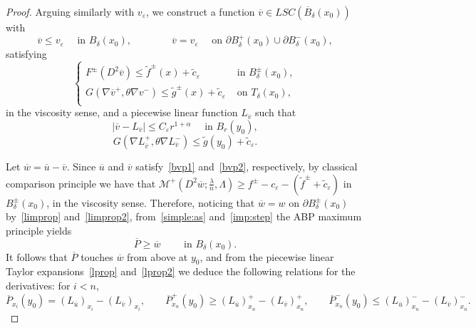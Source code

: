 \documentclass[letter,11pt]{amsart}
\newcommand{\vep}{\varepsilon}
\newcommand{\mcal}{\mathcal{M}}
\newcommand{\lowers}{LSC}
\theoremstyle{definition}
\numberwithin{equation}{section}
\begin{document}
\begin{proof}
Arguing similarly with $v_{\vep}$, we construct a function $\overline{v} \in \lowers(\overline{B}_{\delta}(x_0))$ with
\begin{equation}
\label{limprop2}
\overline{v} \leq v_{\vep} \quad \text{ in } B_{\delta}(x_0),
\qquad \qquad
\overline{v} = v_{\vep} \quad \text{ on } \partial B_{\delta}^{+}(x_0) \cup \partial B_{\delta}^{-}(x_0),
\end{equation}
satisfying
\begin{equation}
\label{bvp2}
\begin{cases}
F^{\pm}(D^2 \overline{v}) \leq \widetilde{f}^{\pm}(x) +\widetilde{c}_{\vep} & \text{ in } B_{\delta}^{\pm}(x_0),\\
G(\nabla \overline{v}^{+}, \theta \nabla v^{-}) \leq \widetilde{g}^{\pm}(x) +\widetilde{c}_{\vep} & \text{ on } T_{\delta}(x_0),\\
\end{cases}
\end{equation}
in the viscosity sense, and a piecewise linear function $L_{\overline{v}}$ such that
\begin{equation}
\label{lprop2}
|\overline{v} - L_{\overline{v}}| \leq C_{\vep} r^{1+\alpha} \quad \text{ in } B_r(y_0),
\end{equation}
\begin{equation}
\label{eq:key22}
G(\nabla L_{\overline{v}}^{+}, \theta \nabla L_{\overline{v}}^{-}) \leq \widetilde{g}(y_0) + \widetilde{c}_{\vep}.
\end{equation}

\medskip

Let $\overline{w} = \overline{u}- \overline{v}$.
Since $\overline{u}$ and $\overline{v}$ satisfy~\eqref{bvp1} and~\eqref{bvp2}, respectively, by classical comparison principle we have that $\mcal^{+}(D^2 \overline{w};\frac{\lambda}{n}, \Lambda) \geq f^{\pm} - c_{\vep} - (\widetilde{f}^{\pm} + \widetilde{c}_{\vep})$ in $B^{\pm}_{\delta}(x_0)$, in the viscosity sense.
Therefore, noticing that $\overline{w} = w$ on $\partial B^{\pm}_{\delta}(x_0)$ by~\eqref{limprop} and~\eqref{limprop2}, from~\eqref{simple:as} and~\eqref{imp:step} the ABP maximum principle yields
\[
\overline{P} \geq \overline{w} \qquad\text{ in } B_{\delta}(x_0).
\]
It follows that $\overline{P}$ touches $\overline{w}$ from above at $y_{0}$, and from the piecewise linear Taylor expansions~\eqref{lprop} and~\eqref{lprop2} we deduce the following relations for the derivatives: for $i < n$,
\begin{equation}
\label{eq:key}
\overline{P}_{x_i}(y_{0}) =  (L_{\overline{u}})_{x_i} - (L_{\overline{v}})_{x_i}, \qquad \overline{P}_{x_n}^{+}(y_{0}) \geq (L_{\overline{u}})_{x_n}^{+} -(L_{\overline{v}})_{x_n}^{+},\qquad \overline{P}_{x_n}^{-}(y_{0}) \leq (L_{\overline{u}})_{x_n}^{-} - (L_{\overline{v}})_{x_n}^{-}.
\end{equation}


\end{proof}
\end{document}
